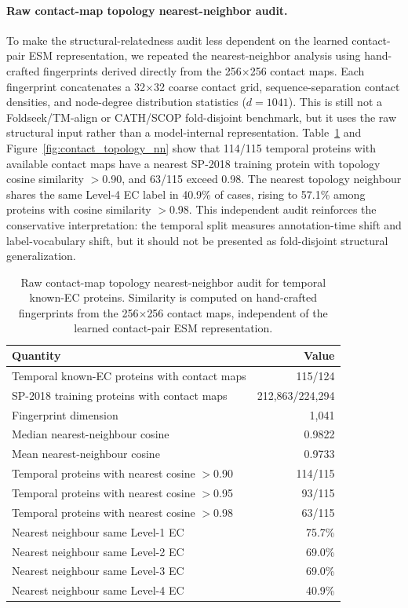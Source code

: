 \documentclass[11pt,a4paper]{article}
\begin{document}
\paragraph{Raw contact-map topology nearest-neighbor audit.}
To make the structural-relatedness audit less dependent on the learned
contact-pair ESM representation, we repeated the nearest-neighbor analysis using
hand-crafted fingerprints derived directly from the 256$\times$256 contact maps.
Each fingerprint concatenates a 32$\times$32 coarse contact grid,
sequence-separation contact densities, and node-degree distribution statistics
($d=1041$). This is still not a Foldseek/TM-align or CATH/SCOP fold-disjoint
benchmark, but it uses the raw structural input rather than a model-internal
representation. Table~\ref{tab:contact_topology_nn} and
Figure~\ref{fig:contact_topology_nn} show that 114/115 temporal proteins with
available contact maps have a nearest SP-2018 training protein with topology
cosine similarity $>$0.90, and 63/115 exceed 0.98. The nearest topology
neighbour shares the same Level-4 EC label in 40.9\% of cases, rising to 57.1\%
among proteins with cosine similarity $>$0.98. This independent audit reinforces
the conservative interpretation: the temporal split measures annotation-time
shift and label-vocabulary shift, but it should not be presented as
fold-disjoint structural generalization.

\begin{table}[htbp]
\centering
\caption{Raw contact-map topology nearest-neighbor audit for temporal known-EC
proteins. Similarity is computed on hand-crafted fingerprints from the
256$\times$256 contact maps, independent of the learned contact-pair ESM
representation.}
\label{tab:contact_topology_nn}
\small
\setlength{\tabcolsep}{5pt}
\begin{tabular}{lr}
\toprule
Quantity & Value \\
\midrule
Temporal known-EC proteins with contact maps & 115/124 \\
SP-2018 training proteins with contact maps & 212{,}863/224{,}294 \\
Fingerprint dimension & 1{,}041 \\
Median nearest-neighbour cosine & 0.9822 \\
Mean nearest-neighbour cosine & 0.9733 \\
Temporal proteins with nearest cosine $>$0.90 & 114/115 \\
Temporal proteins with nearest cosine $>$0.95 & 93/115 \\
Temporal proteins with nearest cosine $>$0.98 & 63/115 \\
Nearest neighbour same Level-1 EC & 75.7\% \\
Nearest neighbour same Level-2 EC & 69.0\% \\
Nearest neighbour same Level-3 EC & 69.0\% \\
Nearest neighbour same Level-4 EC & 40.9\% \\
\bottomrule
\end{tabular}
\end{table}
\end{document}
